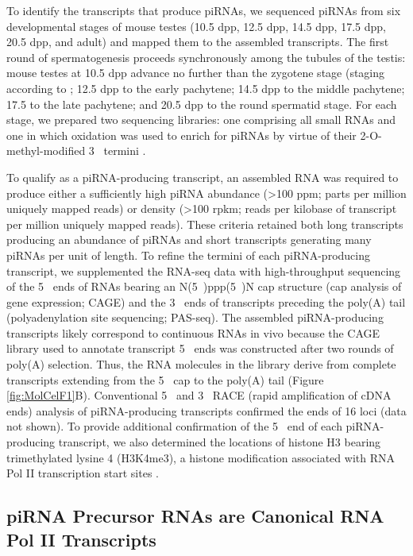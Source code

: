     To identify the transcripts that produce piRNAs, we sequenced piRNAs from six developmental stages of mouse testes (10.5 dpp, 12.5 dpp, 14.5 dpp, 17.5 dpp, 20.5 dpp, and adult) and mapped them to the assembled transcripts. The first round of spermatogenesis proceeds synchronously among the tubules of the testis: mouse testes at 10.5 dpp advance no further than the zygotene stage (staging according to \citep{NEBEL1961}; 12.5 dpp to the early pachytene; 14.5 dpp to the middle pachytene; 17.5 to the late pachytene; and 20.5 dpp to the round spermatid stage. For each stage, we prepared two sequencing libraries: one comprising all small RNAs and one in which oxidation was used to enrich for piRNAs by virtue of their 2\textprime-O-methyl-modified 3\textprime~ termini \citep{Ghildiyal2008}.

    To qualify as a piRNA-producing transcript, an assembled RNA was required to produce either a sufficiently high piRNA abundance (>100 ppm; parts per million uniquely mapped reads) or density (>100 rpkm; reads per kilobase of transcript per million uniquely mapped reads). These criteria retained both long transcripts producing an abundance of piRNAs and short transcripts generating many piRNAs per unit of length. To refine the termini of each piRNA-producing transcript, we supplemented the RNA-seq data with high-throughput sequencing of the 5\textprime~ ends of RNAs bearing an N(5\textprime~)ppp(5\textprime~)N cap structure (cap analysis of gene expression; CAGE) and the 3\textprime~ ends of transcripts preceding the poly(A) tail (polyadenylation site sequencing; PAS-seq). The assembled piRNA-producing transcripts likely correspond to continuous RNAs in vivo because the CAGE library used to annotate transcript 5\textprime~ ends was constructed after two rounds of poly(A) selection. Thus, the RNA molecules in the library derive from complete transcripts extending from the 5\textprime~ cap to the poly(A) tail (Figure \ref{fig:MolCelF1}B). Conventional 5\textprime~ and 3\textprime~ RACE (rapid amplification of cDNA ends) analysis of piRNA-producing transcripts confirmed the ends of 16 loci (data not shown). To provide additional confirmation of the 5\textprime~ end of each piRNA-producing transcript, we also determined the locations of histone H3 bearing trimethylated lysine 4 (H3K4me3), a histone modification associated with RNA Pol II transcription start sites \cite{Guenther2007}.

  \subsection{piRNA Precursor RNAs are Canonical RNA Pol II Transcripts}

